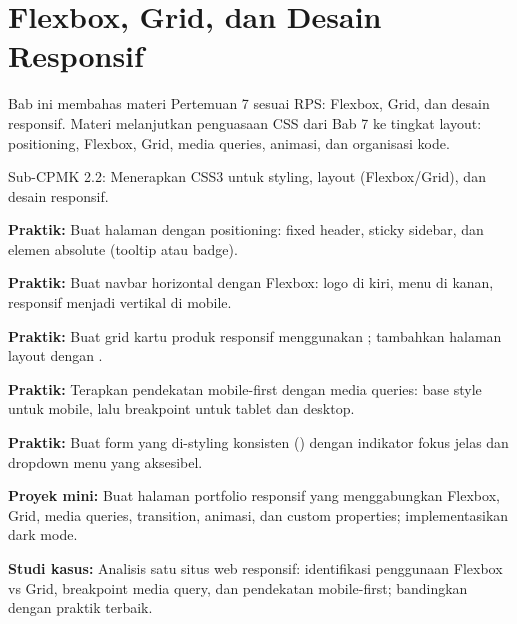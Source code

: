 \documentclass[../main.tex]{subfiles}
\begin{document}
\chapter{Flexbox, Grid, dan Desain Responsif}

Bab ini membahas materi Pertemuan 7 sesuai RPS: Flexbox, Grid, dan desain responsif. Materi melanjutkan penguasaan CSS dari Bab 7 ke tingkat layout: positioning, Flexbox, Grid, media queries, animasi, dan organisasi kode.

\begin{subcpmk}
  \item Sub-CPMK 2.2: Menerapkan CSS3 untuk styling, layout (Flexbox/Grid), dan desain responsif.
\end{subcpmk}
























\begin{aktivitas}
  \item \textbf{Praktik:} Buat halaman dengan positioning: fixed header, sticky sidebar, dan elemen absolute (tooltip atau badge).
  \item \textbf{Praktik:} Buat navbar horizontal dengan Flexbox: logo di kiri, menu di kanan, responsif menjadi vertikal di mobile.
  \item \textbf{Praktik:} Buat grid kartu produk responsif menggunakan ; tambahkan halaman layout dengan .
  \item \textbf{Praktik:} Terapkan pendekatan mobile-first dengan media queries: base style untuk mobile, lalu  breakpoint untuk tablet dan desktop.
  \item \textbf{Praktik:} Buat form yang di-styling konsisten () dengan indikator fokus jelas dan dropdown menu yang aksesibel.
  \item \textbf{Proyek mini:} Buat halaman portfolio responsif yang menggabungkan Flexbox, Grid, media queries, transition, animasi, dan custom properties; implementasikan dark mode.
  \item \textbf{Studi kasus:} Analisis satu situs web responsif: identifikasi penggunaan Flexbox vs Grid, breakpoint media query, dan pendekatan mobile-first; bandingkan dengan praktik terbaik.
\end{aktivitas}
\end{document}
